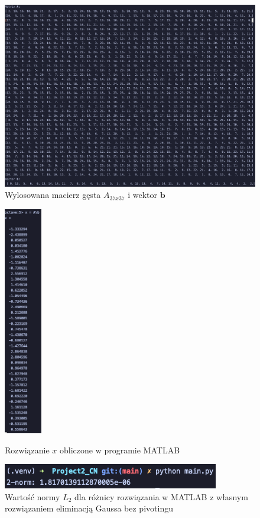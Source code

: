 \documentclass{article}
\begin{document}
\begin{figure}[htbp]
  \centering
  \includegraphics[width=0.9\linewidth]{Ab.png}
  \caption{Wylosowana macierz gęsta $A_{37x37}$ i wektor $\textbf{b}$}
  \label{fig:Ab}
\end{figure}

\begin{figure}[H]
  \centering
  \begin{minipage}[b]{0.45\linewidth}
    \centering
    \includegraphics[height=10cm]{x_matlab.png}
    \caption{Rozwiązanie $x$ obliczone w programie MATLAB}
    \label{fig:x_matlab}
  \end{minipage}
  \begin{minipage}[b]{0.45\linewidth}
    \centering
    \includegraphics[width=\linewidth]{2norm1.png}
    \caption{Wartość normy $L_2$ dla różnicy rozwiązania w MATLAB z własnym rozwiązaniem eliminacją Gaussa bez pivotingu}
    \label{fig:2norm1}
  \end{minipage}
\end{figure}
\end{document}
